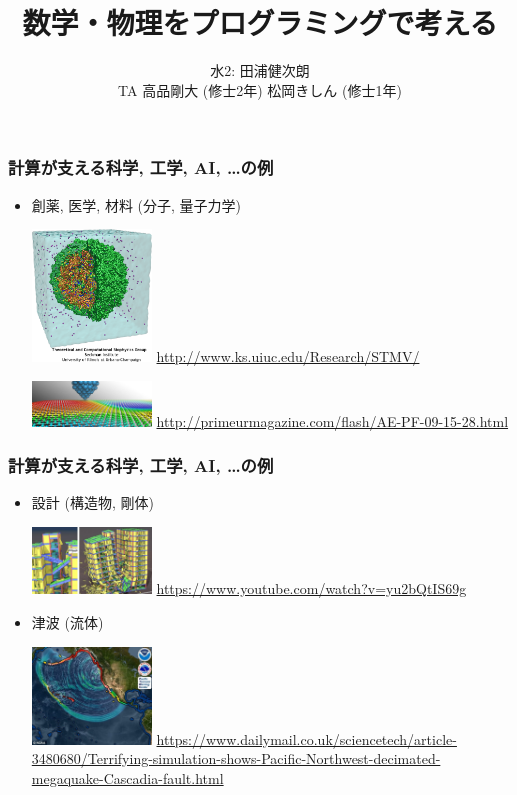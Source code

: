 \documentclass[12pt,dvipdfmx]{beamer}
\title{数学・物理をプログラミングで考える}
\institute{}
\author{水2: 田浦健次朗 \\
TA 高品剛大 (修士2年) 松岡きしん (修士1年) \\
}
\date{}
\begin{document}
\maketitle

\begin{frame}
  \frametitle{計算が支える科学, 工学, AI, \ldots の例}
  \begin{itemize}
  \item 創薬, 医学, 材料 (分子, 量子力学)

    \includegraphics[width=0.25\textwidth]{out/pdf/img/virus.pdf}
    {\tiny\url{http://www.ks.uiuc.edu/Research/STMV/}}

    \includegraphics[width=0.25\textwidth]{out/pdf/img/material.pdf}
    {\tiny\url{http://primeurmagazine.com/flash/AE-PF-09-15-28.html}}
  \end{itemize}
\end{frame}

\begin{frame}
  \frametitle{計算が支える科学, 工学, AI, \ldots の例}
  \begin{itemize}
  \item 設計 (構造物, 剛体)

    \includegraphics[width=0.25\textwidth]{out/pdf/img/building.pdf}
    {\tiny\url{https://www.youtube.com/watch?v=yu2bQtIS69g}}
  
  \item 津波 (流体)

    \includegraphics[width=0.25\textwidth]{out/pdf/img/tsunami.pdf}
    {\tiny\url{https://www.dailymail.co.uk/sciencetech/article-3480680/Terrifying-simulation-shows-Pacific-Northwest-decimated-megaquake-Cascadia-fault.html}}

  \end{itemize}
\end{frame}
\end{document}
